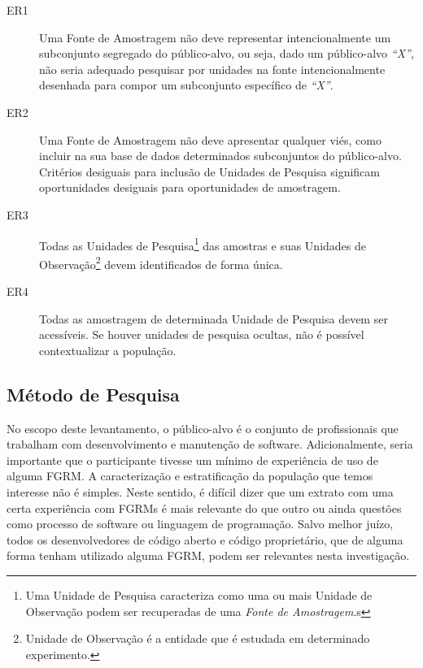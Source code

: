 \begin{description}

    \item[ER1] Uma Fonte de Amostragem não deve representar intencionalmente um
               subconjunto segregado do público-alvo, ou seja, dado um
               público-alvo \textit{``X''}, não seria adequado pesquisar por
               unidades na fonte intencionalmente desenhada para compor um
               subconjunto específico de \textit{``X''}.

    \item[ER2] Uma Fonte de Amostragem não deve apresentar qualquer viés, como
               incluir na sua base de dados determinados subconjuntos do
               público-alvo.  Critérios desiguais para inclusão de Unidades de
               Pesquisa significam oportunidades desiguais para oportunidades
               de amostragem.

    \item[ER3] Todas as Unidades de Pesquisa\footnote{Uma Unidade de Pesquisa
               caracteriza como uma ou mais Unidade de Observação podem ser
               recuperadas de uma \textit{Fonte de Amostragem}.s} das amostras e
               suas Unidades de Observação\footnote{Unidade de Observação é a
               entidade que é estudada em determinado experimento.}
               devem identificados de forma única.

    \item[ER4] Todas as amostragem de determinada Unidade de Pesquisa devem ser
               acessíveis. Se houver unidades de pesquisa ocultas,
               não é possível contextualizar a população.

\end{description}

\subsection{Método de Pesquisa}\label{subsec:pesq_metodologias}

No escopo deste levantamento, o público-alvo é o conjunto de profissionais que
trabalham com desenvolvimento e manutenção de software. Adicionalmente, seria
importante que o participante tivesse um mínimo de experiência de uso de alguma
FGRM\@. A caracterização e estratificação da população que temos interesse não
é simples. Neste sentido, é difícil dizer que um extrato com uma certa
experiência com FGRMs é mais relevante do que outro ou ainda questões como
processo de software ou linguagem de programação. Salvo melhor juízo, todos os
desenvolvedores de código aberto e código proprietário, que de alguma forma
tenham utilizado alguma FGRM, podem ser relevantes nesta investigação.

